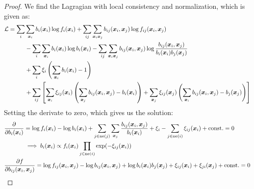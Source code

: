 \begin{proof}
    We find the Lagragian with local consistency and normalization, which is given as:
    \begin{equation*}
    \begin{aligned}
        \mathcal{L} = \sum_{i}&\sum_{\boldsymbol x_i}b_i(\boldsymbol x_i)\log f_i(\boldsymbol x_i) + \sum_{ij}\sum_{\boldsymbol x_i\boldsymbol x_j}b_{ij}(\boldsymbol x_i, \boldsymbol x_j)\log f_{ij}(\boldsymbol x_i,\boldsymbol x_j) \\
        &- \sum_i\sum_{\boldsymbol x_i}b_i(\boldsymbol x_i)\log b_i(\boldsymbol x_i)-\sum_{ij}\sum_{\boldsymbol x_i\boldsymbol x_j}b_{ij}(\boldsymbol x_i, \boldsymbol x_j)\log\frac{b_{ij}(\boldsymbol x_i, \boldsymbol x_j)}{b_i(\boldsymbol x_i)b_j(\boldsymbol x_j)} \\
        &+ \sum_i\xi_i\left( \sum_{\boldsymbol x_i}b_i(\boldsymbol x_i)-1 \right) \\
        &+ \sum_{ij}\left[  \sum_{\boldsymbol x_i}\xi_{ij}(\boldsymbol x_{i})\left( \sum_{\boldsymbol x_j}b_{ij}(\boldsymbol x_i, \boldsymbol x_j) - b_i(\boldsymbol x_i) \right) + \sum_{\boldsymbol x_j}\xi_{ij}(\boldsymbol x_j)\left(  \sum_{\boldsymbol x_i}b_{ij}(\boldsymbol x_i, \boldsymbol x_j) - b_j(\boldsymbol x_j)  \right)  \right]
    \end{aligned}
    \end{equation*}
    Setting the derivate to zero, which gives us the solution:
    \allowdisplaybreaks
    \begin{align*}
        &\begin{aligned}[t]
            \frac{\partial}{\partial b_i(\boldsymbol x_i)} &= \log f_i(\boldsymbol x_i) - \log b_i(\boldsymbol x_i) + \sum_{j\in\operatorname{ne}(j)}\sum_{\boldsymbol x_j}\frac{b_{ij}(\boldsymbol x_i, \boldsymbol x_j)}{b_i(\boldsymbol x_i)} + \xi_i - \sum_{j\in\operatorname{ne}(i)}\xi_{ij}(\boldsymbol x_i) + \const = 0 \\
            &\implies b_i(\boldsymbol x_i) \propto f_i(\boldsymbol x_i)\prod_{j\in\operatorname{ne}(i)} \exp(-\xi_{ij}(\boldsymbol x_i))
        \end{aligned} \\
        &\begin{aligned}[t]
            \frac{\partial f}{\partial b_{ij}(\boldsymbol x_i, \boldsymbol x_j)} &= \log f_{ij}(\boldsymbol x_i, \boldsymbol x_j) - \log b_{ij}(\boldsymbol x_i, \boldsymbol x_j) + \log b_i(\boldsymbol x_i)b_j(\boldsymbol x_j) + \xi_{ij}(\boldsymbol x_i) + \xi_{ji}(\boldsymbol x_j) + \const = 0 \\

\end{aligned}
\end{align*}
\end{proof}
